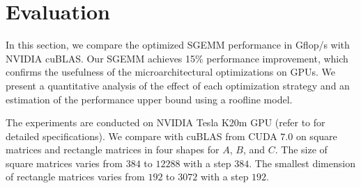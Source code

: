 \section{Evaluation}
\label{sec:experiment}

In this section, we compare the optimized SGEMM performance in Gflop/s with NVIDIA cuBLAS. 
Our SGEMM achieves 15\% %
performance
improvement, which confirms the usefulness of the microarchitectural optimizations on GPUs. 
We present 
a quantitative analysis of the effect of each optimization strategy and an estimation of the performance upper bound using a roofline model.

The experiments are conducted on NVIDIA Tesla K20m GPU (refer to \cite{gk110} for detailed specifications). 
We compare with cuBLAS from CUDA $7.0$ on square matrices and rectangle matrices in four shapes for $A$, $B$, and $C$. 
The size of square matrices varies from $384$ to $12288$ with a step $384$. The smallest dimension of rectangle matrices varies from $192$ to $3072$ with a step $192$.

